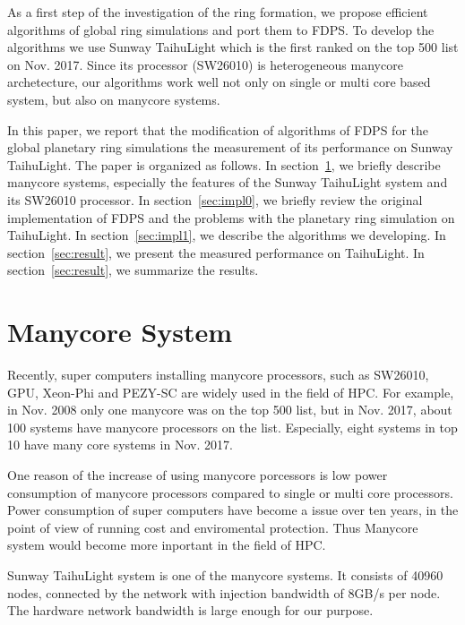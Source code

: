 \documentclass[oribibl]{llncs}
\begin{document}
As a first step of the investigation of the ring formation, we propose
efficient algorithms of global ring simulations and port them to
FDPS. To develop the algorithms we use Sunway TaihuLight which is the
first ranked on the top 500 list on Nov. 2017. Since its processor
(SW26010) is heterogeneous manycore archetecture, our algorithms work
well not only on single or multi core based system, but also on
manycore systems.

In this paper, we report that the modification of algorithms of FDPS
for the global planetary ring simulations the measurement of its
performance on Sunway TaihuLight. The paper is organized as
follows. In section~\ref{sec:TaihuLight}, we briefly describe manycore
systems, especially the features of the Sunway TaihuLight system and
its SW26010 processor. In section~\ref{sec:impl0}, we briefly review
the original implementation of FDPS and the problems with the
planetary ring simulation on TaihuLight. In section~\ref{sec:impl1},
we describe the algorithms we developing. In section~\ref{sec:result},
we present the measured performance on TaihuLight. In
section~\ref{sec:result}, we summarize the results.



\section{Manycore System}
\label{sec:TaihuLight}

Recently, super computers installing manycore processors, such as
SW26010, GPU, Xeon-Phi and PEZY-SC are widely used in the field of
HPC.  For example, in Nov. 2008 only one manycore was on the top 500
list, but in Nov. 2017, about 100 systems have manycore processors on
the list. Especially, eight systems in top 10 have many core systems
in Nov. 2017.

One reason of the increase of using manycore porcessors is low power
consumption of manycore processors compared to single or multi core
processors. Power consumption of super computers have become a issue
over ten years, in the point of view of running cost and enviromental
protection. Thus Manycore system would become more inportant in the
field of HPC.

Sunway TaihuLight system is one of the manycore systems. It consists
of 40960 nodes, connected by the network with injection bandwidth of
8GB/s per node. The hardware network bandwidth is large enough for our
purpose.
\end{document}
